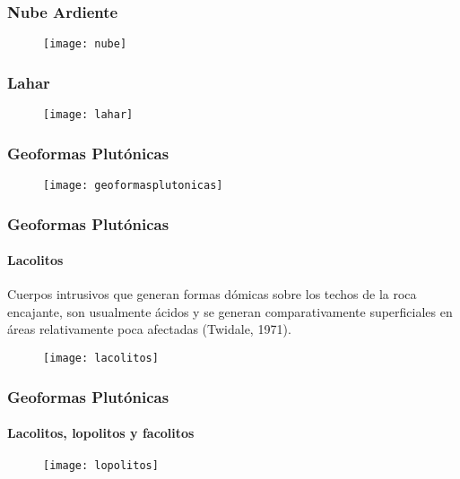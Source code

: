 \documentclass{beamer}
\begin{document}
\begin{frame}
\frametitle{Nube Ardiente}
\begin{figure}
\begin{center}
\texttt{[image: nube]}
\end{center}
\end{figure}
\end{frame}
\begin{frame}
\frametitle{Lahar}
\begin{figure}
\begin{center}
\texttt{[image: lahar]}
\end{center}
\end{figure}
\end{frame}
\begin{frame}
\frametitle{Geoformas Plutónicas}
\begin{figure}
\begin{center}
\texttt{[image: geoformasplutonicas]}
\end{center}
\end{figure}
\end{frame}
\begin{frame}
\frametitle{Geoformas Plutónicas}
\framesubtitle{Lacolitos}
\small{Cuerpos intrusivos que generan formas dómicas sobre los techos de la roca encajante, son usualmente ácidos y se generan comparativamente superficiales en áreas relativamente  poca afectadas (Twidale, 1971)}.\\
\begin{figure}
\begin{center}
\texttt{[image: lacolitos]}
\end{center}
\end{figure}
\end{frame}
\begin{frame}
\frametitle{Geoformas Plutónicas}
\framesubtitle{Lacolitos, lopolitos y facolitos}
\begin{figure}
\begin{center}
\texttt{[image: lopolitos]}
\end{center}
\end{figure}
\end{frame}
\end{document}
